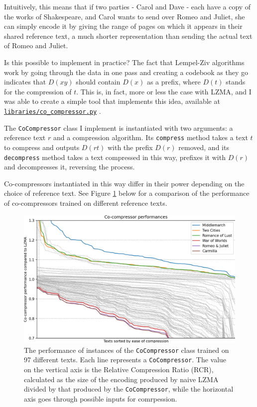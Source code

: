 Intuitively, this means that if two parties - Carol and Dave - each have a copy of the works of Shakespeare, and Carol wants to send over Romeo and Juliet, she can simply encode it by giving the range of pages on which it appears in their shared reference text, a much shorter representation than sending the actual text of Romeo and Juliet.

Is this possible to implement in practice? The fact that Lempel-Ziv algorithms work by going through the data in one pass and creating a codebook as they go indicates that $D(xy)$ should contain $D(x)$ as a prefix, where $D(t)$ stands for the compression of $t$. This is, in fact, more or less the case with LZMA, and I was able to create a simple tool that implements this idea, available at \texttt{\href{https://github.com/Guy29/FYP/blob/main/Code/libraries/co_compressor.py}{libraries/co\_compressor.py}} .

The \texttt{CoCompressor} class I implement is instantiated with two arguments: a reference text $r$ and a compression algorithm. Its \texttt{compress} method takes a text $t$ to compress and outputs $D(rt)$ with the prefix $D(r)$ removed, and its \texttt{decompress} method takes a text compressed in this way, prefixes it with $D(r)$ and decompresses it, reversing the process.

Co-compressors instantiated in this way differ in their power depending on the choice of reference text. See Figure \ref{fig:cocomp_comparison} below for a comparison of the performance of co-compressors trained on different reference texts.

\begin{figure}[h]
\centering
\includegraphics[width=\textwidth]{img/fig_cocomp_performance.png}
\caption{The performance of instances of the \texttt{CoCompressor} class trained on 97 different texts. Each line represents a \texttt{CoCompressor}. The value on the vertical axis is the Relative Compression Ratio (RCR), calculated as the size of the encoding produced by naive LZMA divided by that produced by the \texttt{CoCompressor}, while the horizontal axis goes through possible inputs for comrpession.}
\label{fig:cocomp_comparison}
\end{figure}

